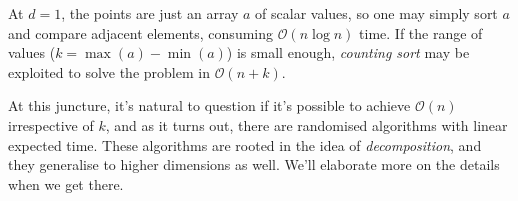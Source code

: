 At $d=1$, the points are just an array $a$ of scalar values, so one may simply sort $a$ and
compare adjacent elements, consuming
$\mathcal{O}(n \log n)$ time. If the range of values ($k = \max(a) - \min(a)$)
is small enough, \textit{counting sort} may be exploited to solve the problem
in $\mathcal{O}(n + k)$.

At this juncture, it's natural to question if it's possible to achieve $\mathcal{O}(n)$
irrespective of $k$, and as it turns out, there are randomised
algorithms with linear expected time. These algorithms are rooted in
the idea of \textit{decomposition}, and they generalise to higher dimensions as well.
We'll elaborate more on the details when we get there.
